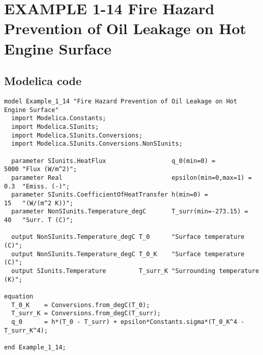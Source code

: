 \documentclass{modelica}
\begin{document}
\thispagestyle{empty}
\date{} %

\section*{EXAMPLE 1-14 Fire Hazard Prevention of Oil Leakage on Hot Engine Surface}

\subsection*{Modelica code}


\begin{lstlisting}[mathescape=true] 
model Example_1_14 "Fire Hazard Prevention of Oil Leakage on Hot Engine Surface"
  import Modelica.Constants;
  import Modelica.SIunits;
  import Modelica.SIunits.Conversions;
  import Modelica.SIunits.Conversions.NonSIunits;

  parameter SIunits.HeatFlux                  q_0(min=0) =           5000 "Flux (W/m^2)";
  parameter Real                              epsilon(min=0,max=1) = 0.3  "Emiss. (-)";
  parameter SIunits.CoefficientOfHeatTransfer h(min=0) =             15   "(W/(m^2 K))";
  parameter NonSIunits.Temperature_degC       T_surr(min=-273.15) =  40   "Surr. T (C)";

  output NonSIunits.Temperature_degC T_0      "Surface temperature (C)";
  output NonSIunits.Temperature_degC T_0_K    "Surface temperature (C)";
  output SIunits.Temperature         T_surr_K "Surrounding temperature (K)";

equation 
  T_0_K    = Conversions.from_degC(T_0);
  T_surr_K = Conversions.from_degC(T_surr);
  q_0      = h*(T_0 - T_surr) + epsilon*Constants.sigma*(T_0_K^4 - T_surr_K^4);
  
end Example_1_14;  
\end{lstlisting}
\end{document}
